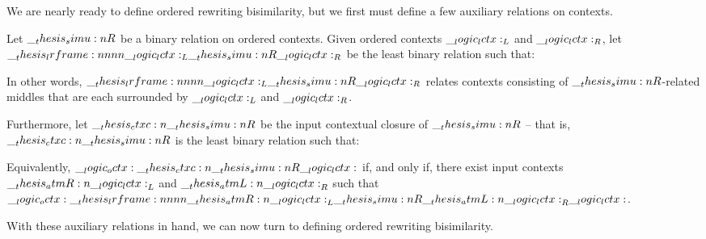 We are nearly ready to define ordered rewriting bisimilarity, but we first must define a few auxiliary relations on contexts.
%
\begin{definition}\label{def:ordered-bisimilarity:framed-relation}
  Let $\__thesis_simu:n {R}$ be a binary relation on ordered contexts.
  Given ordered contexts $\__logic_lctx:_L$ and $\__logic_lctx:_R$, let $\lrframe{\lctx_L}{\simu{R}}{\lctx_R}$ be the least binary relation such that:
  \begin{inferences}
  \end{inferences}
  In other words, $\lrframe{\lctx_L}{\simu{R}}{\lctx_R}$ relates contexts consisting of $\__thesis_simu:n {R}$-related middles that are each surrounded by $\__logic_lctx:_L$ and $\__logic_lctx:_R$.

  Furthermore, let $\ctxc{\simu{R}}$ be the input contextual closure of $\__thesis_simu:n {R}$ -- that is, $\ctxc{\simu{R}}$ is the least binary relation such that:
  Equivalently, $\octx \ctxc{\simu{R}} \lctx$ if, and only if, there exist input contexts $\__thesis_atmR:n {\__logic_lctx:}_L$ and $\__thesis_atmL:n {\__logic_lctx:}_R$ such that $\octx \lrframe{\atmR{\lctx}_L}{\simu{R}}{\atmL{\lctx}_R} \lctx$.
\end{definition}
\noindent
With these auxiliary relations in hand, we can now turn to defining ordered rewriting bisimilarity.

